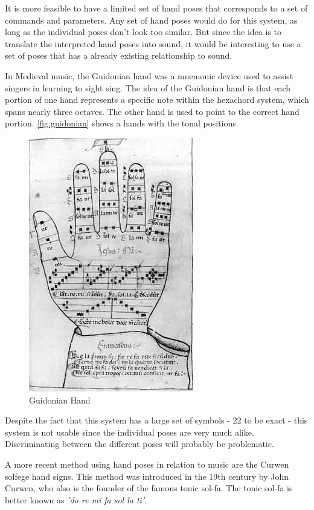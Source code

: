 It is more feasible to have a limited set of hand poses that corresponds to a set of commands and parameters.  Any set of hand poses would do for this system, as long as the individual poses don't look too similar.  But since the idea is to translate the interpreted hand poses into sound, it would be interesting to use a set of poses that has a already existing relationship to sound.

In Medieval music, the Guidonian hand was a mnemonic device used to assist singers in learning to sight sing. The idea of the Guidonian hand is that each portion of one hand represents a specific note within the hexachord system, which spans nearly three octaves. The other hand is used to point to the correct hand portion. \autoref{fig:guidonian} shows a hands with the tonal positions.

\begin{figure}[htbp]
	\centering{}
	\includegraphics[width=0.3\linewidth]{figures/guidonian_hand.jpg}
	\caption{Guidonian Hand}
	\label{fig:guidonian}
\end{figure}

Despite the fact that this system has a large set of symbols - 22 to be exact - this system is not usable since the individual poses are very much alike. Discriminating between the different poses will probably be problematic.

A more recent method using hand poses in relation to music are the Curwen solfege hand signs\cite{choksy1999}. This method was introduced in the 19th century by John Curwen, who also is the founder of the famous tonic sol-fa. The tonic sol-fa is better known as \emph{'do re mi fa sol la ti'}.

